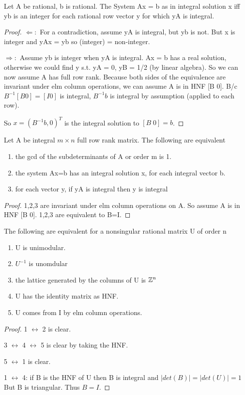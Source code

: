 \begin{corollary}
Let A be rational, b is rational. The System Ax = b as in integral solution x iff yb is an integer for each rational row vector y for which yA is integral.
\end{corollary}
\begin{proof}
$\Leftarrow:$ For a contradiction, assume yA is integral, but yb is not. But x is integer and yAx = yb so (integer) = non-integer.

$\Rightarrow:$ Assume yb is integer when yA is integral. Ax = b has a real solution, otherwise we could find y s.t. yA = 0, yB = 1/2 (by linear algebra). So we can now assume A has full row rank. Because both sides of the equivalence are invariant under elm column operations, we can assume A is in HNF [B 0]. B/c $B^{-1}[B 0] = [I 0]$ is integral, $B^{-1}b$ is integral by assumption (applied to each row).

So $x = (B^{-1}b, 0)^T$ is the integral solution to $[B \;0] = b$.
\end{proof}


\begin{corollary}
Let A be integral $m \times n$  full row rank matrix. The following are equivalent
\begin{enumerate}
	\item the gcd of the subdeterminants of A or order m is 1.
	\item the system Ax=b has an integral solution x, for each integral vector b.
	\item for each vector y, if yA is integral then y is integral
\end{enumerate}
\end{corollary}
\begin{proof}
1,2,3 are invariant under elm column operations on A. So assume A is in HNF [B 0]. 1,2,3 are equivalent to B=I.
\end{proof}



\begin{theorem}
The following are equivalent for a nonsingular rational matrix U of order n
\begin{enumerate}
	\item U is unimodular.
	\item $U^{-1}$ is unomdular
	\item the lattice generated by the columns of U is $\mathbb Z^n$
	\item U has the identity matrix as HNF.
	\item U comes from I by elm column operations.
\end{enumerate}
\end{theorem}
\begin{proof}
1 $\leftrightarrow$ 2 is clear.

3 $\leftrightarrow$ 4 $\leftrightarrow$ 5 is clear by taking the HNF.

5 $\leftrightarrow$ 1 is clear.

1 $\leftrightarrow$ 4: if B is the HNF of U then B is integral and $|det(B)| = |det(U)| =1 $ But B is triangular. Thus $B = I$.
\end{proof}



